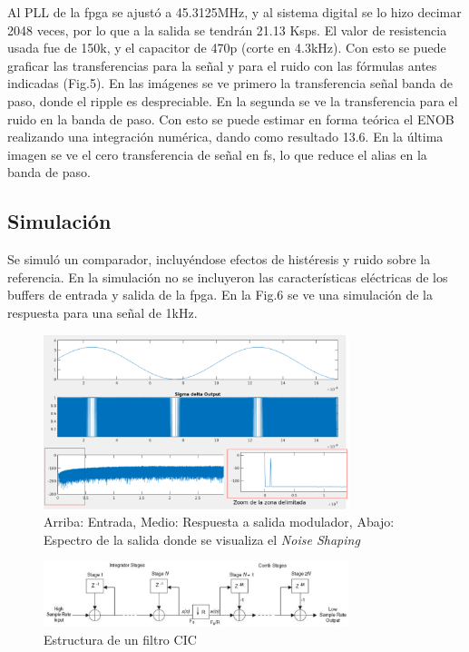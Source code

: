 \documentclass[a4paper,conference]{IEEEtran}
\begin{document}
Al PLL de la fpga se ajust\'o a 45.3125MHz, y al sistema digital se lo hizo decimar 2048 veces, por lo que a la salida se tendrán 21.13 Ksps. El valor de resistencia usada fue de 150k, y el capacitor de 470p (corte en 4.3kHz).
Con esto se puede graficar las transferencias para la señal y para el ruido con las fórmulas antes indicadas (Fig.5). En las im\'agenes se ve primero la transferencia se\~nal banda de paso, donde el ripple es despreciable. En la segunda se ve la transferencia para el ruido en la banda de paso. Con esto se puede estimar en forma te\'orica el ENOB realizando una integraci\'on num\'erica, dando como resultado 13.6. En la \'ultima imagen se ve el cero transferencia de se\~nal en fs, lo que reduce el alias en la banda de paso.


\subsection{Simulaci\'on}

Se simul\'o un comparador, incluy\'endose efectos de hist\'eresis y ruido sobre la referencia. En la simulaci\'on no se incluyeron las caracter\'isticas el\'ectricas de los buffers de entrada y salida de la fpga. En la Fig.6 se ve una simulaci\'on de la respuesta para una señal de 1kHz.

\begin{figure}[!t]
\centering
\includegraphics[height=2in]{Salida_modulador}
\caption{Arriba: Entrada, Medio: Respuesta a salida modulador, Abajo: Espectro de la salida donde se visualiza el \textit{Noise Shaping}}
\label{fig_6}
\end{figure}

\begin{figure}[!b]
\centering
\includegraphics[width=3.5in]{CIC_Topologia}
\caption{Estructura de un filtro CIC}
\label{fig_7}
\end{figure}
\end{document}
